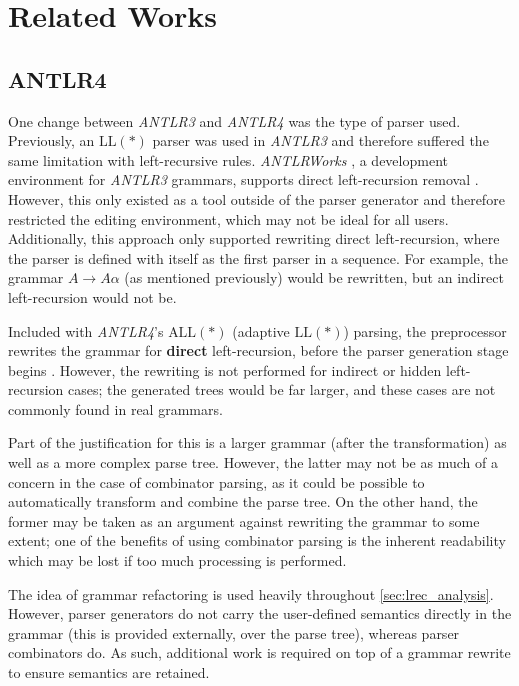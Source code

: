 \section{Related Works}
\label{sec:related}

\subsection{ANTLR4}
\label{ssec:antlr4all}

One change between \textit{ANTLR3} and \textit{ANTLR4} was the type of parser used.
Previously, an $\text{LL}(*)$ parser was used in \textit{ANTLR3} and therefore suffered the same limitation with left-recursive rules.
\textit{ANTLRWorks} \cite{aworks}, a development environment for \textit{ANTLR3} grammars, supports direct left-recursion removal \cite{awlrr}.
However, this only existed as a tool outside of the parser generator and therefore restricted the editing environment, which may not be ideal for all users.
Additionally, this approach only supported rewriting direct left-recursion, where the parser is defined with itself as the first parser in a sequence.
For example, the grammar $A \rightarrow A \alpha$ (as mentioned previously) would be rewritten, but an indirect left-recursion would not be.

Included with \textit{ANTLR4}'s $\text{ALL}(*)$ (adaptive $\text{LL}(*)$) parsing, the preprocessor rewrites the grammar for \textbf{direct} left-recursion, before the parser generation stage begins \cite{parr14}.
However, the rewriting is not performed for indirect or hidden left-recursion cases; the generated trees would be far larger, and these cases are not commonly found in real grammars.

Part of the justification for this is a larger grammar (after the transformation) as well as a more complex parse tree.
However, the latter may not be as much of a concern in the case of combinator parsing, as it could be possible to automatically transform and combine the parse tree.
On the other hand, the former may be taken as an argument against rewriting the grammar to some extent; one of the benefits of using combinator parsing is the inherent readability which may be lost if too much processing is performed.

The idea of grammar refactoring is used heavily throughout \autoref{sec:lrec_analysis}.
However, parser generators do not carry the user-defined semantics directly in the grammar (this is provided externally, over the parse tree), whereas parser combinators do.
As such, additional work is required on top of a grammar rewrite to ensure semantics are retained.


